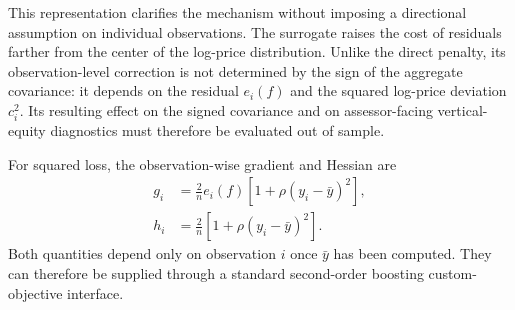 \documentclass[10pt]{article}
\theoremstyle{definition}
\newcommand{\1}{\mathbf{1}}
\begin{document}
{{%

{This representation clarifies the mechanism without imposing a directional assumption on individual observations. The surrogate raises the cost of residuals farther from the center of the log-price distribution. Unlike the direct penalty, its observation-level correction is not determined by the sign of the aggregate covariance: it depends on the residual $e_i(f)$ and the squared log-price deviation $c_i^2$. Its resulting effect on the signed covariance and on assessor-facing vertical-equity diagnostics must therefore be evaluated out of sample.}



For squared loss, the observation-wise gradient and Hessian are
\begin{align}
\label{eq:surrogate_derivatives}
g_i
&=
\frac{2}{n}e_i(f)
\left[1+\rho(y_i-\bar y)^2\right],
\\
h_i
&=
\frac{2}{n}
\left[1+\rho(y_i-\bar y)^2\right].
\end{align}
Both quantities depend only on observation $i$ once $\bar y$ has been computed. They can therefore be supplied through a standard second-order boosting custom-objective interface.

}}
\end{document}
